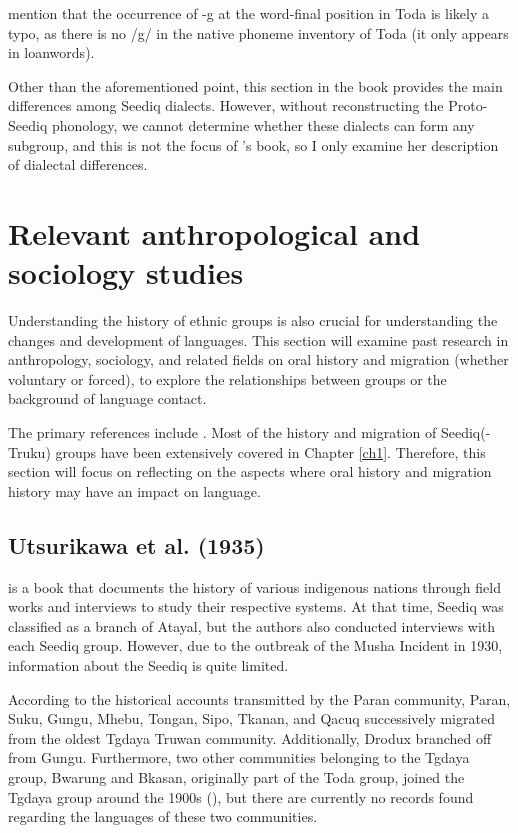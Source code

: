 \textcite[22]{Sung2018Sedgrammar} mention that the occurrence of -g at the word-final position in Toda is likely a typo, as there is no /g/ in the native phoneme inventory of Toda (it only appears in loanwords). 

Other than the aforementioned point, this section in the book provides the main differences among Seediq dialects. However, without reconstructing the Proto-Seediq phonology, we cannot determine whether these dialects can form any subgroup, and this is not the focus of \citeauthor{Sung2018Sedgrammar}'s book, so I only examine her description of dialectal differences.

\section{Relevant anthropological and sociology studies} \label{sec:anth_lit}

Understanding the history of ethnic groups is also crucial for understanding the changes and development of languages. This section will examine past research in anthropology, sociology, and related fields on oral history and migration (whether voluntary or forced), to explore the relationships between groups or the background of language contact. 

The primary references include \textcites{utsurikawaetal1935}{liao1977Sedtheruy}{liao1978Sedtheruy}{yap2023}. Most of the history and migration of Seediq(-Truku) groups have been extensively covered in Chapter \ref{ch1}. Therefore, this section will focus on reflecting on the aspects where oral history and migration history may have an impact on language.

\subsection{Utsurikawa et al. (1935)}

\textcite{utsurikawaetal1935} is a book that documents the history of various indigenous nations through field works and interviews to study their respective systems. At that time, Seediq was classified as a branch of Atayal, but the authors also conducted interviews with each Seediq group. However, due to the outbreak of the Musha Incident in 1930, information about the Seediq is quite limited.

According to the historical accounts transmitted by the Paran community, Paran, Suku, Gungu, Mhebu, Tongan, Sipo, Tkanan, and Qacuq successively migrated from the oldest Tgdaya Truwan community. Additionally, Drodux branched off from Gungu. Furthermore, two other communities belonging to the Tgdaya group, Bwarung and Bkasan, originally part of the Toda group, joined the Tgdaya group around the 1900s (\cite[146--157]{TengChian2023musha}), but there are currently no records found regarding the languages of these two communities.

